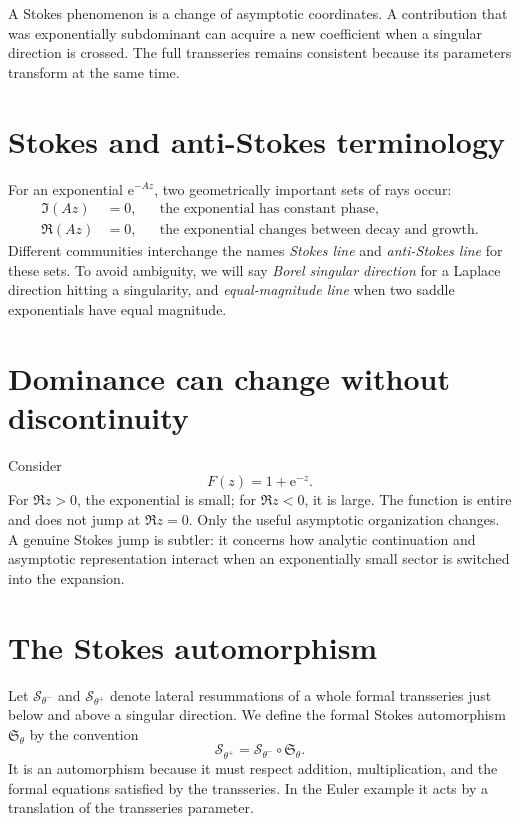 \documentclass[11pt,oneside]{book}
\theoremstyle{definition}
\theoremstyle{remark}
\newcommand{\e}{\mathrm{e}}
\newcommand{\compose}{\mathbin{\circ}}
\begin{document}
\begin{bigidea}
A Stokes phenomenon is a change of asymptotic coordinates. A contribution that
was exponentially subdominant can acquire a new coefficient when a singular
direction is crossed. The full transseries remains consistent because its
parameters transform at the same time.
\end{bigidea}

\section{Stokes and anti-Stokes terminology}

For an exponential $\e^{-Az}$, two geometrically important sets of rays occur:
\begin{align*}
  \Im(Az)&=0, & &\text{the exponential has constant phase},\\
  \Re(Az)&=0, & &\text{the exponential changes between decay and growth}.
\end{align*}
Different communities interchange the names \emph{Stokes line} and
\emph{anti-Stokes line} for these sets. To avoid ambiguity, we will say
\emph{Borel singular direction} for a Laplace direction hitting a singularity,
and \emph{equal-magnitude line} when two saddle exponentials have equal
magnitude.

\section{Dominance can change without discontinuity}

Consider
\[
  F(z)=1+\e^{-z}.
\]
For $\Re z>0$, the exponential is small; for $\Re z<0$, it is large. The
function is entire and does not jump at $\Re z=0$. Only the useful asymptotic
organization changes. A genuine Stokes jump is subtler: it concerns how analytic
continuation and asymptotic representation interact when an exponentially small
sector is switched into the expansion.

\section{The Stokes automorphism}

Let $\mathcal S_{\theta^-}$ and $\mathcal S_{\theta^+}$ denote lateral
resummations of a whole formal transseries just below and above a singular
direction. We define the formal Stokes automorphism $\mathfrak S_\theta$ by the
convention
\begin{equation}
  \mathcal S_{\theta^+}
  =\mathcal S_{\theta^-}\compose\mathfrak S_\theta.
  \label{eq:stokes-automorphism-convention}
\end{equation}
It is an automorphism because it must respect addition, multiplication, and the
formal equations satisfied by the transseries. In the Euler example it acts by
a translation of the transseries parameter.
\end{document}
